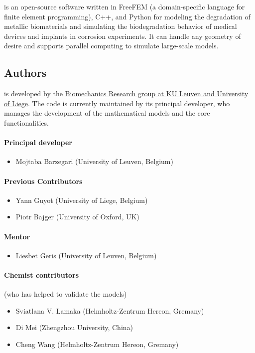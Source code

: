 \biodeg{} is an open-source software written in FreeFEM (a domain-specific language for finite element programming), C++, and Python for modeling the degradation of metallic biomaterials and simulating the biodegradation behavior of medical devices and implants in corrosion experiments. It can handle any geometry of desire and supports parallel computing to simulate large-scale models.

\subsection{Authors}
\label{sec:authors}
\biodeg{} is developed by the \href{http://www.biomech.ulg.ac.be/}{Biomechanics Research group at KU Leuven and University of Liege}. The code is currently maintained by its principal developer,
who manages the development of the mathematical models and the core functionalities.

\paragraph*{Principal developer}
\begin{itemize}
	\item Mojtaba Barzegari (University of Leuven, Belgium)
\end{itemize}

\paragraph*{Previous Contributors}
\begin{itemize}
	\item Yann Guyot (University of Liege, Belgium)
	\item Piotr Bajger (University of Oxford, UK)
\end{itemize}

\paragraph*{Mentor}
\begin{itemize}
	\item Liesbet Geris (University of Leuven, Belgium)
\end{itemize}

\paragraph*{Chemist contributors}
(who has helped to validate the models)
\begin{itemize}
	\item Sviatlana V. Lamaka (Helmholtz-Zentrum Hereon, Gremany)
	\item Di Mei (Zhengzhou University, China)
	\item Cheng Wang (Helmholtz-Zentrum Hereon, Gremany)
\end{itemize}


